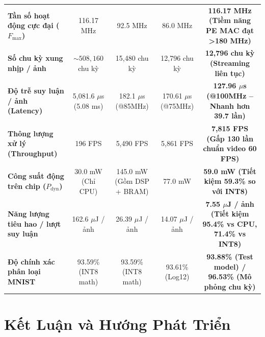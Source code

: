 \documentclass[conference]{IEEEtran}
\begin{document}
\begin{table}[t]
{\begin{tabular}{lcccc}
\textbf{Tần số hoạt động cực đại ($F_{\max}$)} & 116.17 MHz & 92.5 MHz & 86.0 MHz & \textbf{116.17 MHz (Tiềm năng PE MAC đạt >180 MHz)} \\
\textbf{Số chu kỳ xung nhịp / ảnh} & $\sim 508,160$ chu kỳ & 15,480 chu kỳ & 12,796 chu kỳ & \textbf{12,796 chu kỳ (Streaming liên tục)} \\
\textbf{Độ trễ suy luận / ảnh (Latency)} & 5,081.6 $\mu$s (5.08 ms) & 182.1 $\mu$s (@85MHz) & 170.61 $\mu$s (@75MHz) & \textbf{127.96 $\mu$s (@100MHz -- Nhanh hơn 39.7 lần)} \\
\textbf{Thông lượng xử lý (Throughput)} & 196 FPS & 5,490 FPS & 5,861 FPS & \textbf{7,815 FPS (Gấp 130 lần chuẩn video 60 FPS)} \\
\textbf{Công suất động trên chip ($P_{\text{dyn}}$)} & 30.0 mW (Chỉ CPU) & 145.0 mW (Gồm DSP + BRAM) & 77.0 mW & \textbf{59.0 mW (Tiết kiệm 59.3\% so với INT8)} \\
\textbf{Năng lượng tiêu hao / lượt suy luận} & 162.6 $\mu$J / ảnh & 26.39 $\mu$J / ảnh & 14.07 $\mu$J / ảnh & \textbf{7.55 $\mu$J / ảnh (Tiết kiệm 95.4\% vs CPU, 71.4\% vs INT8)} \\
\textbf{Độ chính xác phân loại MNIST} & 93.59\% (INT8 math) & 93.59\% (INT8 math) & 93.61\% (Log12) & \textbf{93.88\% (Test model) / 96.53\% (Mô phỏng chu kỳ)} \\
\bottomrule
\end{tabular}%
}
\end{table}

\newpage
\section{Kết Luận và Hướng Phát Triển}
\label{sec:conclusion}
\end{document}
